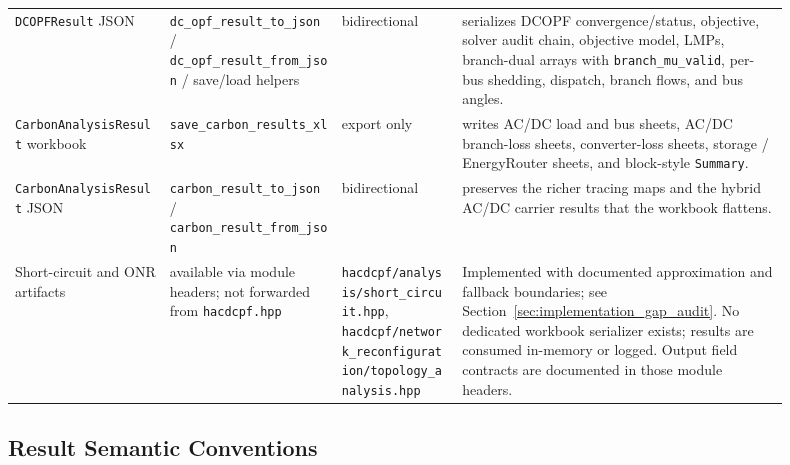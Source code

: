 \begin{longtable}{@{}L{0.18\linewidth}L{0.20\linewidth}L{0.14\linewidth}L{0.38\linewidth}@{}}
\texttt{DCOPFResult} JSON & \texttt{dc\_opf\_result\_to\_json} / \texttt{dc\_opf\_result\_from\_json} / save/load helpers & bidirectional & serializes DCOPF convergence/status, objective, solver audit chain, objective model, LMPs, branch-dual arrays with \texttt{branch\_mu\_valid}, per-bus shedding, dispatch, branch flows, and bus angles. \\
\texttt{CarbonAnalysisResult} workbook & \texttt{save\_carbon\_results\_xlsx} & export only & writes AC/DC load and bus sheets, AC/DC branch-loss sheets, converter-loss sheets, storage / EnergyRouter sheets, and block-style \texttt{Summary}. \\
\texttt{CarbonAnalysisResult} JSON & \texttt{carbon\_result\_to\_json} / \texttt{carbon\_result\_from\_json} & bidirectional & preserves the richer tracing maps and the hybrid AC/DC carrier results that the workbook flattens. \\
Short-circuit and ONR artifacts & available via module headers; not forwarded from \texttt{hacdcpf.hpp} & \texttt{hacdcpf/analysis/short\_circuit.hpp}, \texttt{hacdcpf/network\_reconfiguration/topology\_analysis.hpp} & Implemented with documented approximation and fallback boundaries; see Section~\ref{sec:implementation_gap_audit}.  No dedicated workbook serializer exists; results are consumed in-memory or logged.  Output field contracts are documented in those module headers. \\
\bottomrule
\end{longtable}

\subsection{Result Semantic Conventions}

